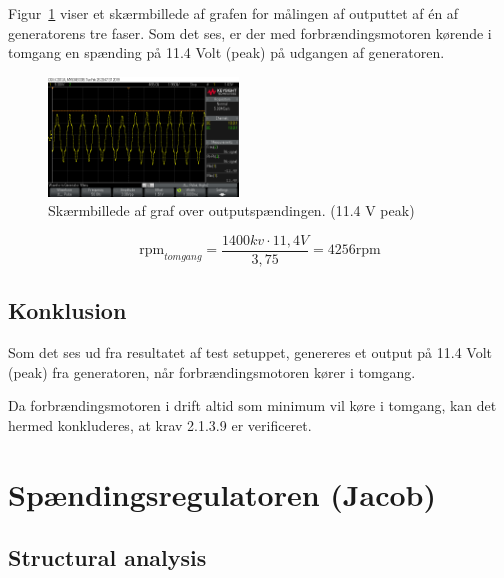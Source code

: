 Figur~\ref{fig:scope1} viser et skærmbillede af grafen for målingen af outputtet af én af generatorens tre faser.  
Som det ses, er der med forbrændingsmotoren kørende i tomgang en spænding på 11.4 Volt (peak) på udgangen af generatoren. 

\begin{figure}[h]
  \centering
  \includegraphics[width=0.45\textwidth]{scope0.png}
  \caption{Skærmbillede af graf over outputspændingen. (11.4 V peak)}
  \label{fig:scope1}
\end{figure}


\begin{equation}
  \label{eq:1}
  \mathrm{rpm}_{tomgang}=\frac{1400kv\cdot 11,4V}{3,75}=4256 \mathrm{rpm}
\end{equation}


\subsection{Konklusion}
\label{sec:konklusion}

Som det ses ud fra resultatet af test setuppet, genereres et output på 11.4 Volt (peak) fra generatoren, når forbrændingsmotoren kører i tomgang. 

Da forbrændingsmotoren i drift altid som minimum vil køre i tomgang, kan det hermed konkluderes, at krav 2.1.3.9 er verificeret. 
\clearpage
\section{Spændingsregulatoren (Jacob)}
\label{sec:spandingsregulatoren}

\subsection{Structural analysis}
\label{sec:structural-analysis}

